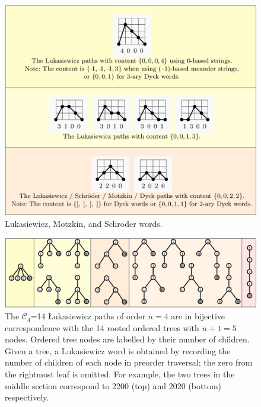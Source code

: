 \begin{figure}[]
	\centering
	\includegraphics[width = .95 \textwidth]{paths.png}
	\caption{Lukasiewicz, Motzkin, and Schroder words.}
	\label{fig:paths}
\end{figure}




\begin{figure}[]
	\centering
	\includegraphics[width = .95 \textwidth]{trees.png}
	\caption{The $\mathcal{C}_4$=14 Łukasiewicz paths of order $n=4$ are in bijective correspondence with the 14 rooted ordered trees with $n+1=5$ nodes.  Ordered tree nodes are labelled by their number of children.  Given a tree, a Lukasiewicz word is obtained by recording the number of children of each node in preorder traversal; the zero from the rightmost leaf is omitted.  For example, the two trees in the middle section correspond to 2200 (top) and 2020 (bottom) respectively.}
	\label{fig:lukatrees}
\end{figure}


